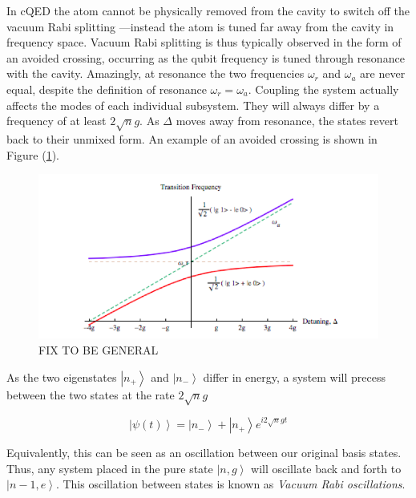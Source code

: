 \documentclass[12 pt]{book}
\newcommand{\ket}[1]{\left| #1 \right>} %
\begin{document}
In cQED the atom cannot be physically removed from the cavity to switch off the vacuum Rabi splitting —instead the atom is tuned far away from the cavity in frequency space. Vacuum Rabi splitting is thus typically observed in the form of an avoided crossing, occurring as the qubit frequency is tuned through resonance with the cavity\cite{Bishop}. Amazingly, at resonance the two frequencies $\omega_r$ and $\omega_a$ are never equal, despite the definition of resonance $\omega_r=\omega_a$. Coupling the system actually affects the modes of each individual subsystem. They will always differ by a frequency of at least $2\sqrt{n}g$. As $\Delta$ moves away from resonance, the states revert back to their unmixed form. An example of an avoided crossing is shown in Figure (\ref{fig:AvoidedCrossing}).

\begin{figure}[h] 
   \centering
   \includegraphics[width=5in]{ElizaAvoidedCrossing.png} 
   \caption{FIX TO BE GENERAL}
   \label{fig:AvoidedCrossing}
\end{figure}

As the two eigenstates $\ket{n_+}$ and $\ket{n_-}$ differ in energy, a system will precess between the two states at the rate $2\sqrt{n}g$

\begin{equation}
\ket{\psi(t)}=\ket{n_-}+\ket{n_+}e^{i2\sqrt{n}gt}
\end{equation}

Equivalently, this can be seen as an oscillation between our original basis states. Thus, any system placed in the pure state $\ket{n,g}$ will oscillate back and forth to $\ket{n-1,e}$. This oscillation between states is known as \emph{Vacuum Rabi oscillations}. 

\end{document}
